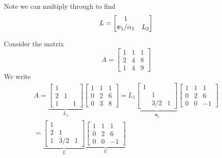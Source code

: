 Note we can multiply through to find
\[
L = \begin{bmatrix}
1 \\
\bm{{\mbox{\boldmath$v$\unboldmath}}}_1/\alpha_1 & L_2 \end{bmatrix}
\]
\begin{example}[LU by-hand] Consider the matrix
\[
A = \begin{bmatrix} 1 & 1 & 1 \\
                    2 & 4 & 8 \\
                    1 & 4 & 9
                    \end{bmatrix}
\]
We write
\begin{align*}
A = \underbrace{\begin{bmatrix} 1  \\
                    2 & 1 &  \\
                    1 &  & 1
                    \end{bmatrix}}_{L_1} \begin{bmatrix} 1 & 1 & 1 \\
                    0 & 2 & 6 \\
                    0 & 3 & 8
                    \end{bmatrix} 
 = L_1 \underbrace{\begin{bmatrix} 1  \\
                     & 1 &  \\
                     & 3/2 & 1
                    \end{bmatrix}}_{{\Lt}_2} \begin{bmatrix} 1 & 1 & 1 \\
                    0 & 2 & 6 \\
                    0 & 0 & -1
                    \end{bmatrix} \\
= \underbrace{\begin{bmatrix} 1  \\
                    2 & 1 &  \\
                    1 & 3/2 & 1
                    \end{bmatrix}}_{L} \underbrace{\begin{bmatrix} 1 & 1 & 1 \\
                    0 & 2 & 6 \\
                    0 & 0 & -1
                    \end{bmatrix}}_U
\end{align*}
\end{example}

